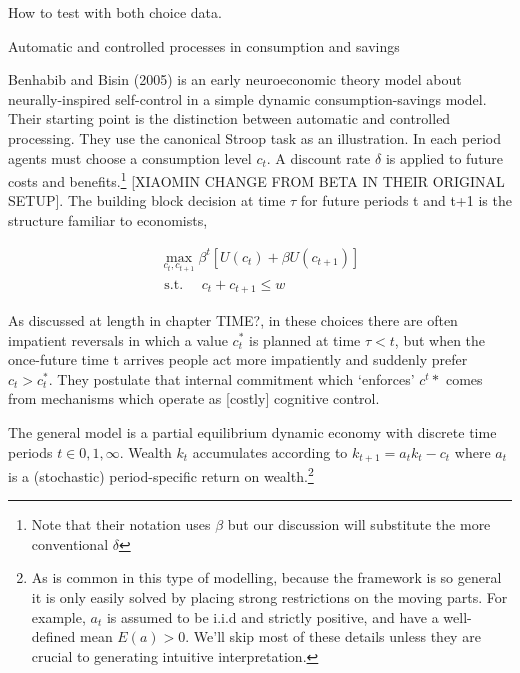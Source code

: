 \documentclass{article}
\begin{document}
How to test with both choice data.

Automatic and controlled processes in consumption and savings

Benhabib and Bisin (2005) is an early neuroeconomic theory model about neurally-inspired self-control in a simple dynamic consumption-savings model. Their starting point is the distinction between automatic and controlled processing. They use the canonical Stroop task as an illustration. 
In each period agents must choose a consumption level $c_t$. A discount rate $\delta$ is applied to future costs and benefits.\footnote{Note that their notation uses $\beta$ but our discussion will substitute the more conventional $\delta$} [XIAOMIN CHANGE FROM BETA IN THEIR ORIGINAL SETUP].  The building block decision at time $\tau$ for future periods t and t+1 is the structure familiar to economists, 

\begin{equation*}
	\begin{array}{l}
	\max _{c_{t}, c_{t+1}} \beta^{t}\left[U\left(c_{t}\right)+\beta U\left(c_{t+1}\right)\right] \\
	\text { s.t. } \quad c_{t}+c_{t+1} \leqslant w
	\end{array}
\end{equation*}

As discussed at length in chapter TIME?, in these choices there are often impatient reversals in which a value $c_t^*$ is planned at time $\tau<t$, but when the once-future time t arrives people act more impatiently and suddenly prefer $c_t>c_t^*$. They postulate that internal commitment which ‘enforces’ $c^t*$ comes from mechanisms which operate as [costly] cognitive control. 

The general model is a partial equilibrium dynamic economy with discrete time periods $t \in {0, 1, \infty}$. Wealth $k_t$ accumulates according to $k_{t+1}=a_tk_t-c_t$ where $a_t$ is a (stochastic) period-specific return on wealth.\footnote{As is common in this type of modelling, because the framework is so general it is only easily solved by placing strong restrictions on the moving parts. For example, $a_t$ is assumed to be i.i.d and strictly positive, and have a well-defined mean $E(a)>0$. We’ll skip most of these details unless they are crucial to generating intuitive interpretation.}
\end{document}
